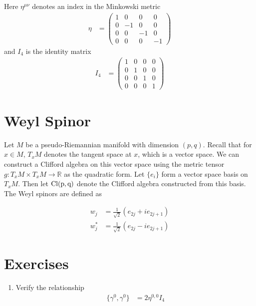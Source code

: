 \documentclass[book.tex]{subfiles}
\begin{document}
Here $\eta^{\mu\nu}$ denotes an index in the Minkowski metric
\begin{align}
    \eta &= \begin{pmatrix}
    1 & 0 & 0 & 0 \\
    0 & -1 & 0 & 0 \\
    0 & 0 & -1 & 0 \\
    0 & 0 & 0 & -1 
    \end{pmatrix}
\end{align}
and $I_4$ is the identity matrix
\begin{align}
    I_4 &= \begin{pmatrix}
    1 & 0 & 0 & 0 \\
    0 & 1 & 0 & 0 \\
    0 & 0 & 1 & 0 \\
    0 & 0 & 0 & 1 
    \end{pmatrix}
\end{align}

\section{Weyl Spinor}

Let $M$ be a pseudo-Riemannian manifold with dimension $(p, q)$. Recall that for $x \in M$, $T_x M$ denotes the tangent space at $x$, which is a vector space. We can construct a Clifford algebra on this vector space using the metric tensor $g: T_x M \times T_x M \to \mathbb{R}$ as the quadratic form. Let $\{e_i\}$ form a vector space basis on $T_x M$. Then let $\rm{Cl}(p, q)$ denote the Clifford algebra constructed from this basis. The Weyl spinors are defined as

\begin{align}
    w_j &= \frac{1}{\sqrt{2}}(e_{2j} + i e_{2j + 1}) \\
    w_j^* &= \frac{1}{\sqrt{2}}(e_{2j} - i e_{2j + 1}) 
\end{align}



\section{Exercises}
\begin{enumerate}
    \item Verify the relationship 
    \begin{align}
        \{\gamma^0, \gamma^0\} &= 2 \eta^{0,0} I_4
    \end{align}
\end{enumerate}
\end{document}
